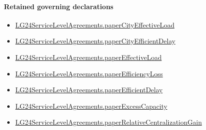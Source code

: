 \documentclass[10pt]{article}
\begin{document}
\paragraph{Retained governing declarations}
\begin{itemize}\raggedright
\item \hyperlink{governing-declaration-4b08fa8d929029a4}{LG24\allowbreak{}Service\allowbreak{}Level\allowbreak{}Agreements.\allowbreak{}paper\allowbreak{}City\allowbreak{}Effective\allowbreak{}Load}
\item \hyperlink{governing-declaration-453cff1a6b01907e}{LG24\allowbreak{}Service\allowbreak{}Level\allowbreak{}Agreements.\allowbreak{}paper\allowbreak{}City\allowbreak{}Efficient\allowbreak{}Delay}
\item \hyperlink{governing-declaration-f6f1c85dcb682371}{LG24\allowbreak{}Service\allowbreak{}Level\allowbreak{}Agreements.\allowbreak{}paper\allowbreak{}Effective\allowbreak{}Load}
\item \hyperlink{governing-declaration-a93f808fc9b83a7a}{LG24\allowbreak{}Service\allowbreak{}Level\allowbreak{}Agreements.\allowbreak{}paper\allowbreak{}Efficiency\allowbreak{}Loss}
\item \hyperlink{governing-declaration-70a77d3cfca440a2}{LG24\allowbreak{}Service\allowbreak{}Level\allowbreak{}Agreements.\allowbreak{}paper\allowbreak{}Efficient\allowbreak{}Delay}
\item \hyperlink{governing-declaration-cfc6c9e8c89655cd}{LG24\allowbreak{}Service\allowbreak{}Level\allowbreak{}Agreements.\allowbreak{}paper\allowbreak{}Excess\allowbreak{}Capacity}
\item \hyperlink{governing-declaration-190b788157441ff2}{LG24\allowbreak{}Service\allowbreak{}Level\allowbreak{}Agreements.\allowbreak{}paper\allowbreak{}Relative\allowbreak{}Centralization\allowbreak{}Gain}
\end{itemize}
\end{document}
